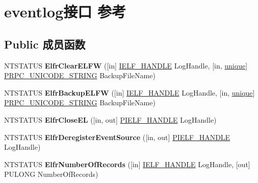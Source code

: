 \hypertarget{interfaceeventlog}{}\section{eventlog接口 参考}
\label{interfaceeventlog}
\subsection*{Public 成员函数}
\begin{DoxyCompactItemize}
\item 
\mbox{\label{interfaceeventlog_aafa59b0503e1c3cffa63f02f0d0794be}} 
N\+T\+S\+T\+A\+T\+US {\bfseries Elfr\+Clear\+E\+L\+FW} (\mbox{[}in\mbox{]} \hyperlink{interfacevoid}{I\+E\+L\+F\+\_\+\+H\+A\+N\+D\+LE} Log\+Handle, \mbox{[}in, \hyperlink{interfaceunique}{unique}\mbox{]} \hyperlink{struct___r_p_c___u_n_i_c_o_d_e___s_t_r_i_n_g}{P\+R\+P\+C\+\_\+\+U\+N\+I\+C\+O\+D\+E\+\_\+\+S\+T\+R\+I\+NG} Backup\+File\+Name)
\item 
\mbox{\label{interfaceeventlog_a539f130e833d3b3ed64bd2c027585a71}} 
N\+T\+S\+T\+A\+T\+US {\bfseries Elfr\+Backup\+E\+L\+FW} (\mbox{[}in\mbox{]} \hyperlink{interfacevoid}{I\+E\+L\+F\+\_\+\+H\+A\+N\+D\+LE} Log\+Handle, \mbox{[}in, \hyperlink{interfaceunique}{unique}\mbox{]} \hyperlink{struct___r_p_c___u_n_i_c_o_d_e___s_t_r_i_n_g}{P\+R\+P\+C\+\_\+\+U\+N\+I\+C\+O\+D\+E\+\_\+\+S\+T\+R\+I\+NG} Backup\+File\+Name)
\item 
\mbox{\label{interfaceeventlog_a6e90d7e363b52dae79761026127008f0}} 
N\+T\+S\+T\+A\+T\+US {\bfseries Elfr\+Close\+EL} (\mbox{[}in, out\mbox{]} \hyperlink{interfacevoid}{P\+I\+E\+L\+F\+\_\+\+H\+A\+N\+D\+LE} Log\+Handle)
\item 
\mbox{\label{interfaceeventlog_aa1f2337cdb2bf1d82987aff2df8bda41}} 
N\+T\+S\+T\+A\+T\+US {\bfseries Elfr\+Deregister\+Event\+Source} (\mbox{[}in, out\mbox{]} \hyperlink{interfacevoid}{P\+I\+E\+L\+F\+\_\+\+H\+A\+N\+D\+LE} Log\+Handle)
\item 
\mbox{\label{interfaceeventlog_a7b7be9742d7404d92561187cc05be07b}} 
N\+T\+S\+T\+A\+T\+US {\bfseries Elfr\+Number\+Of\+Records} (\mbox{[}in\mbox{]} \hyperlink{interfacevoid}{I\+E\+L\+F\+\_\+\+H\+A\+N\+D\+LE} Log\+Handle, \mbox{[}out\mbox{]} P\+U\+L\+O\+NG Number\+Of\+Records)

\end{DoxyCompactItemize}
